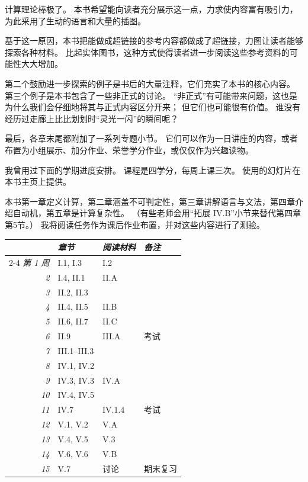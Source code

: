 计算理论棒极了。
本书希望能向读者充分展示这一点，力求使内容富有吸引力，为此采用了生动的语言和大量的插图。

基于这一原因，本书把能做成超链接的参考内容都做成了超链接，力图让读者能够探索各种材料。
比起实体图书，这种方式使得读者进一步阅读这些参考资料的可能性大大增加。

第二个鼓励进一步探索的例子是书后的大量注释，它们充实了本书的核心内容。
第三个例子是本书包含了一些非正式的讨论。
“非正式”有可能带来问题，这也是为什么我们会仔细地将其与正式内容区分开来；
但它们也可能很有价值。
谁没有经历过走廊上比比划划时“灵光一闪”的瞬间呢？

最后，各章末尾都附加了一系列专题小节。
它们可以作为一日讲座的内容，或者布置为小组展示、加分作业、荣誉学分作业，或仅仅作为兴趣读物。

我曾用过下面的学期进度安排。
课程是四学分，每周上课三次。
使用的幻灯片在本书主页上提供。

本书第一章定义计算，第二章涵盖不可判定性，第三章讲解语言与文法，第四章介绍自动机，第五章是计算复杂性。
（有些老师会用“拓展 IV.B”小节来替代第四章第5节。）
我将阅读任务作为课后作业布置，并对这些内容进行了测验。

\begin{center}\small
\begin{tabular}{r|lll}
  \multicolumn{1}{c}{\ }
             &\textit{章节} &\textit{阅读材料} &\textit{备注} \\ \cline{2-4}
  \textit{第 1 周} &I.1, I.3     &I.2                     \\
  \textit{     2} &I.4, II.1    &II.A                    \\
  \textit{     3} &II.2, II.3   &                        \\
  \textit{     4} &II.4, II.5   &II.B                    \\
  \textit{     5} &II.6, II.7   &II.C                     \\
  \textit{     6} &II.9         &III.A      &\textsc{考试} \\
  \textit{     7} &III.1--III.3 &                       \\
  \textit{     8} &IV.1, IV.2                             \\
  \textit{     9} &IV.3, IV.3   &IV.A                        \\
  \textit{    10} &IV.4, IV.5   &                            \\
  \textit{    11} &IV.7         &IV.1.4    &\textsc{考试} \\
  \textit{    12} &V.1, V.2     &V.A                      \\
  \textit{    13} &V.4, V.5     &V.3                      \\
  \textit{    14} &V.6, V.6     &V.B       &        \\
  \textit{    15} &V.7          &\textsc{讨论}   &\textsc{期末复习} \\
\end{tabular}
\end{center}

